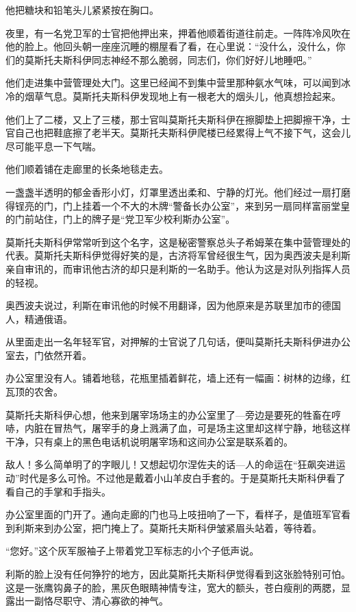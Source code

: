 他把糖块和铅笔头儿紧紧按在胸口。

夜里，有一名党卫军的士官把他押出来，押着他顺着街道往前走。一阵阵冷风吹在他的脸上。他回头朝一座座沉睡的棚屋看了看，在心里说：“没什么，没什么，你们的莫斯托夫斯科伊同志神经不那么脆弱，同志们，你们好好儿地睡吧。”

他们走进集中营管理处大门。这里已经闻不到集中营里那种氨水气味，可以闻到冰冷的烟草气息。莫斯托夫斯科伊发现地上有一根老大的烟头儿，他真想捡起来。

他们上了二楼，又上了三楼，那士官叫莫斯托夫斯科伊在擦脚垫上把脚擦干净，士官自己也把鞋底擦了老半天。莫斯托夫斯科伊爬楼已经累得上气不接下气，这会儿尽可能平息一下气喘。

他们顺着铺在走廊里的长条地毯走去。

一盏盏半透明的郁金香形小灯，灯罩里透出柔和、宁静的灯光。他们经过一扇打磨得锃亮的门，门上挂着一个不大的木牌“警备长办公室”，来到另一扇同样富丽堂皇的门前站住，门上的牌子是“党卫军少校利斯办公室”。

莫斯托夫斯科伊常常听到这个名字，这是秘密警察总头子希姆莱在集中营管理处的代表。莫斯托夫斯科伊觉得好笑的是，古济将军曾经很生气，因为奥西波夫是利斯亲自审讯的，而审讯他古济的却只是利斯的一名助手。他认为这是对队列指挥人员的轻视。

奥西波夫说过，利斯在审讯他的时候不用翻译，因为他原来是苏联里加市的德国人，精通俄语。

从里面走出一名年轻军官，对押解的士官说了几句话，便叫莫斯托夫斯科伊进办公室去，门依然开着。

办公室里没有人。铺着地毯，花瓶里插着鲜花，墙上还有一幅画：树林的边缘，红瓦顶的农舍。

莫斯托夫斯科伊心想，他来到屠宰场场主的办公室里了—旁边是要死的牲畜在哼哧，内脏在冒热气，屠宰手的身上溅满了血，可是场主这里却这样宁静，地毯这样干净，只有桌上的黑色电话机说明屠宰场和这间办公室是联系着的。

敌人！多么简单明了的字眼儿！又想起切尔涅佐夫的话—人的命运在“狂飙突进运动”时代是多么可怜。不过他是戴着小山羊皮白手套的。于是莫斯托夫斯科伊看了看自己的手掌和手指头。

办公室里面的门开了。通向走廊的门也马上吱扭响了一下，看样子，是值班军官看到利斯来到办公室，把门掩上了。莫斯托夫斯科伊皱紧眉头站着，等待着。

“您好。”这个灰军服袖子上带着党卫军标志的小个子低声说。

利斯的脸上没有任何狰狞的地方，因此莫斯托夫斯科伊觉得看到这张脸特别可怕。这是一张鹰钩鼻子的脸，黑灰色眼睛神情专注，宽大的额头，苍白瘦削的两腮，显露出一副恪尽职守、清心寡欲的神气。

